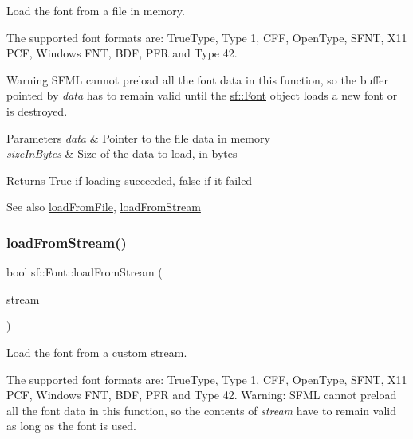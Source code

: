 Load the font from a file in memory. 

The supported font formats are\+: True\+Type, Type 1, C\+FF, Open\+Type, S\+F\+NT, X11 P\+CF, Windows F\+NT, B\+DF, P\+FR and Type 42.

\begin{DoxyWarning}{Warning}
S\+F\+ML cannot preload all the font data in this function, so the buffer pointed by {\itshape data} has to remain valid until the \mbox{\hyperlink{classsf_1_1_font}{sf\+::\+Font}} object loads a new font or is destroyed.
\end{DoxyWarning}

\begin{DoxyParams}{Parameters}
{\em data} & Pointer to the file data in memory \\
\hline
{\em size\+In\+Bytes} & Size of the data to load, in bytes\\
\hline
\end{DoxyParams}
\begin{DoxyReturn}{Returns}
True if loading succeeded, false if it failed
\end{DoxyReturn}
\begin{DoxySeeAlso}{See also}
\mbox{\hyperlink{classsf_1_1_font_ab020052ef4e01f6c749a85571c0f3fd1}{load\+From\+File}}, \mbox{\hyperlink{classsf_1_1_font_abc3f37a354ce8b9a21f8eb93bd9fdafb}{load\+From\+Stream}} \begin{DoxyVerb}\end{DoxyVerb}
 
\end{DoxySeeAlso}
\mbox{\label{classsf_1_1_font_abc3f37a354ce8b9a21f8eb93bd9fdafb}} 
\subsubsection{\texorpdfstring{loadFromStream()}{loadFromStream()}}
{\footnotesize\ttfamily bool sf\+::\+Font\+::load\+From\+Stream (\begin{DoxyParamCaption}\item[{\mbox{\hyperlink{classsf_1_1_input_stream}{Input\+Stream}} \&}]{stream }\end{DoxyParamCaption})}



Load the font from a custom stream. 

The supported font formats are\+: True\+Type, Type 1, C\+FF, Open\+Type, S\+F\+NT, X11 P\+CF, Windows F\+NT, B\+DF, P\+FR and Type 42. Warning\+: S\+F\+ML cannot preload all the font data in this function, so the contents of {\itshape stream} have to remain valid as long as the font is used.

